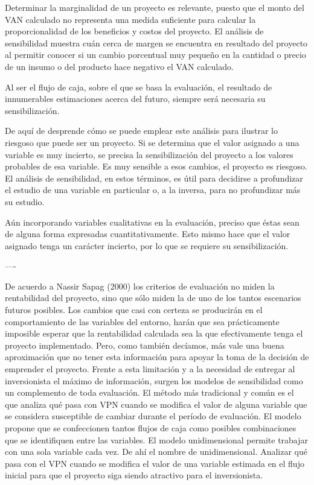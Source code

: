 Determinar la marginalidad de un proyecto es relevante, puesto que el monto del VAN calculado no representa una medida suficiente para calcular la proporcionalidad de los beneficios y costos del proyecto. El análisis de sensibilidad muestra cuán cerca de margen se encuentra en resultado del proyecto al permitir conocer si un cambio porcentual muy pequeño en la cantidad o precio de un insumo o del producto hace negativo el VAN calculado.

Al ser el flujo de caja, sobre el que se basa la evaluación, el resultado de innumerables estimaciones acerca del futuro, siempre será necesaria su sensibilización.

De aquí de desprende cómo se puede emplear este análisis para ilustrar lo riesgoso que puede ser un proyecto. Si se determina que el valor asignado a una variable es muy incierto, se precisa la sensibilización del proyecto a los valores probables de esa variable. Es muy sensible a esos cambios, el proyecto es riesgoso. El análisis de sensibilidad, en estos términos, es útil para decidirse a profundizar el estudio de una variable en particular o, a la inversa, para no profundizar más su estudio.

Aún incorporando variables cualitativas en la evaluación, preciso que éstas sean de alguna forma expresadas cuantitativamente. Esto mismo hace que el valor asignado tenga un carácter incierto, por lo que se requiere su sensibilización.




----




De acuerdo a Nassir Sapag (2000) los criterios de evaluación no miden la rentabilidad
del proyecto, sino que sólo miden la de uno de los tantos escenarios futuros posibles. Los
cambios que casi con certeza se producirán en el comportamiento de las variables del entorno,
harán que sea prácticamente imposible esperar que la rentabilidad calculada sea la que
efectivamente tenga el proyecto implementado. Pero, como también decíamos, más vale una
buena aproximación que no tener esta información para apoyar la toma de la decisión de
emprender el proyecto.
Frente a esta limitación y a la necesidad de entregar al inversionista el máximo de
información, surgen los modelos de sensibilidad como un complemento de toda evaluación.
El método más tradicional y común es el que analiza qué pasa con VPN cuando se
modifica el valor de alguna variable que se considera susceptible de cambiar durante el
período de evaluación.
El modelo propone que se confeccionen tantos flujos de caja como posibles
combinaciones que se identifiquen entre las variables.
El modelo unidimensional permite trabajar con una sola variable cada vez. De ahí el
nombre de unidimensional.
Analizar qué pasa con el VPN cuando se modifica el valor de una variable estimada en
el flujo inicial para que el proyecto siga siendo atractivo para el inversionista.


